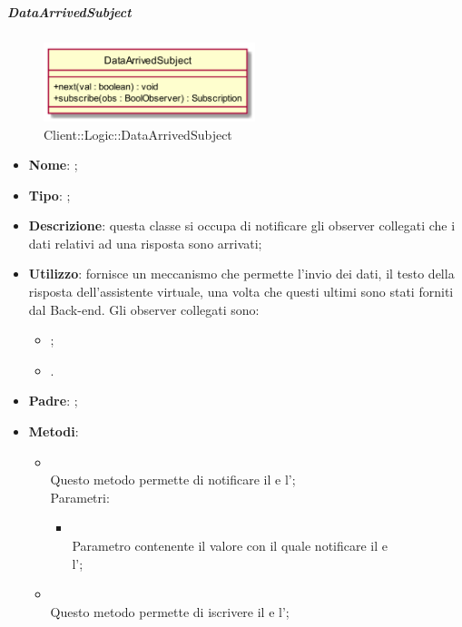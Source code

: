 \hypertarget{DataArrivedSubject_label}{\subparagraph{DataArrivedSubject}}
\begin{figure}[h]
	\centering
	\includegraphics[width=0.55\textwidth,height=\textheight,keepaspectratio]{images/ClassDataArrivedSubject.png}
	\caption{Client::Logic::DataArrivedSubject}
\end{figure}
\begin{itemize}
	\item \textbf{Nome}: ;
	\item \textbf{Tipo}: ;
	\item \textbf{Descrizione}: questa classe si occupa di notificare gli observer collegati che i dati relativi ad una risposta sono arrivati;
	\item \textbf{Utilizzo}: fornisce un meccanismo che permette l'invio dei dati, il testo della risposta dell'assistente virtuale, una volta che questi ultimi sono stati forniti dal Back-end.
Gli observer collegati sono:
\begin{itemize}
\item {};
\item {}.
\end{itemize}
	\item \textbf{Padre}: ;
	\item \textbf{Metodi}:
	\begin{itemize}
		\item[]  \\		Questo metodo permette di notificare il  e l';\\
		Parametri:
		\begin{itemize}
			\item {} \\
			Parametro contenente il valore con il quale notificare il  e \\ l';
		\end{itemize}
		\item[]  \\		Questo metodo permette di iscrivere il  e l';\\

\end{itemize}
\end{itemize}
